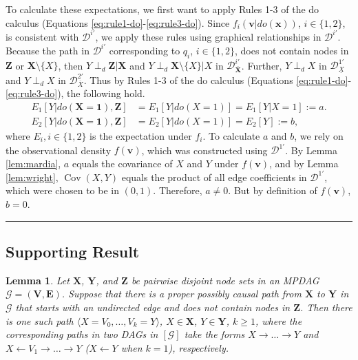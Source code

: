 \documentclass[twoside]{article}
\newtheorem{lemma}[theorem]{Lemma}
\DeclareMathOperator{\Cov}{Cov}
\newcommand{\mb}[1]{\mathbf{#1}}
\newcommand{\dsepp}{\perp_{d}}
\newcommand{\g}[1][G]{\mathcal{#1}}
\newenvironment{proofof}[1][]{\begin{trivlist}
\item[\hskip \labelsep {\bfseries Proof of #1.}]}{\hfill\BlackBox\end{trivlist}}
\newcommand{\BlackBox}{\rule{1.5ex}{1.5ex}}
\begin{document}
\begin{proofof}[Proposition \ref{prop:id-necessary}]
    To calculate these expectations, we first want to apply Rules 1-3 of the do calculus (Equations \eqref{eq:rule1-do}-\eqref{eq:rule3-do}). Since $f_i(\mb{v} | do(\mb{x}))$, $i \in \{1,2\}$, is consistent with $\g[D]^{i'}$, we apply these rules using graphical relationships in $\g[D]^{i'}$. Because the path in $\g[D]^{i'}$ corresponding to $q_i$, $i \in \{1,2\}$, does not contain nodes in $\mb{Z}$ or $\mb{X} \setminus \{X\}$, then $Y \dsepp \mb{Z} | \mb{X}$ and $Y \dsepp \mb{X} \setminus \{X\} | X$ in $\g[D]^{i'}_{\overline{\mb{X}}}$. Further, $Y \dsepp X$ in $\g[D]^{1'}_{\underline{X}}$ and $Y \dsepp X$ in $\g[D]^{2'}_{\overline{X}}$. Thus by Rules 1-3 of the do calculus (Equations \eqref{eq:rule1-do}-\eqref{eq:rule3-do}), the following hold.
    \begin{align*}
        E_1[Y | do(\mb{X}=\mb{1}), \mb{Z}] &= E_1[Y | do(X=1)] = E_1[Y|X=1] := a.\\
        E_2[Y | do(\mb{X}=\mb{1}), \mb{Z}] &= E_2[Y | do(X=1)] = E_2[Y] := b,
    \end{align*}    
    where $E_i, i \in \{1,2\}$ is the expectation under $f_i$. To calculate $a$ and $b$, we rely on the observational density $f(\mb{v})$, which was constructed using $\g[D]^{1'}$. By Lemma \ref{lem:mardia}, $a$ equals the covariance of $X$ and $Y$ under $f(\mb{v})$, and by Lemma \ref{lem:wright}, $\Cov(X,Y)$ equals the product of all edge coefficients in $\g[D]^{1'}$, which were chosen to be in $(0,1)$. Therefore, $a \neq 0$. But by definition of $f(\mb{v})$, $b=0$.
\end{proofof}




\subsection{Supporting Result}

\begin{lemma}
\label{lem:twopaths-corrollary}
    Let $\mb{X}$, $\mb{Y}$, and $\mb{Z}$ be pairwise disjoint node sets in an MPDAG $\g=(\mb{V},\mb{E})$. Suppose that there is a proper possibly causal path from $\mb{X}$ to $\mb{Y}$ in $\g$ that starts with an undirected edge and does not contain nodes in $\mb{Z}$. Then there is one such path $\langle X=V_0, \dots, V_k=Y \rangle$, $X \in \mb{X}$, $Y \in \mb{Y}$, $k \ge 1$, where the corresponding paths in two DAGs in $[\g]$ take the forms $X \to \dots \to Y$ and $X \gets V_1 \to \dots \to Y$ ($X \gets Y$ when $k=1$), respectively.
\end{lemma}
\end{document}
